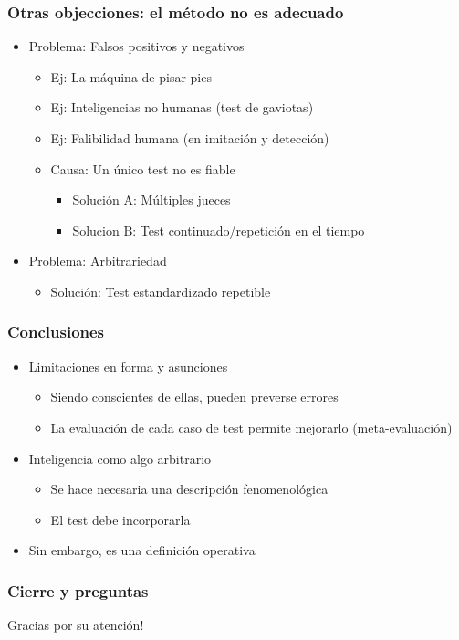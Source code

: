\documentclass{beamer}
\begin{document}
\begin{frame}
\frametitle{Otras objecciones: el método no es adecuado
}
\begin{itemize}
    \item Problema: Falsos positivos y negativos
    \begin{itemize}
        \item Ej: La máquina de pisar pies
        \item Ej: Inteligencias no humanas (test de gaviotas)
        \item Ej: Falibilidad humana (en imitación y detección)
        \item Causa: Un único test no es fiable
        \begin{itemize}
            \item Solución A: Múltiples jueces
            \item Solucion B: Test continuado/repetición en el tiempo
        \end{itemize}
    \end{itemize}
    \item Problema: Arbitrariedad
    \begin{itemize}
        \item Solución: Test estandardizado repetible
    \end{itemize}
\end{itemize}

\end{frame}

\begin{frame}
\frametitle{Conclusiones}

\begin{itemize}
    \item Limitaciones en forma y asunciones
    \begin{itemize}
        \item Siendo conscientes de ellas, pueden preverse errores
        \item La evaluación de cada caso de test permite mejorarlo (meta-evaluación)
    \end{itemize}
    \item Inteligencia como algo arbitrario
    \begin{itemize}
        \item Se hace necesaria una descripción fenomenológica
        \item El test debe incorporarla
    \end{itemize}
    \item Sin embargo, es una definición operativa
\end{itemize}

\end{frame}


\begin{frame}
\frametitle{Cierre y preguntas}
\Huge{\centerline{Gracias por su atención!}}
\end{frame}

\end{document}
